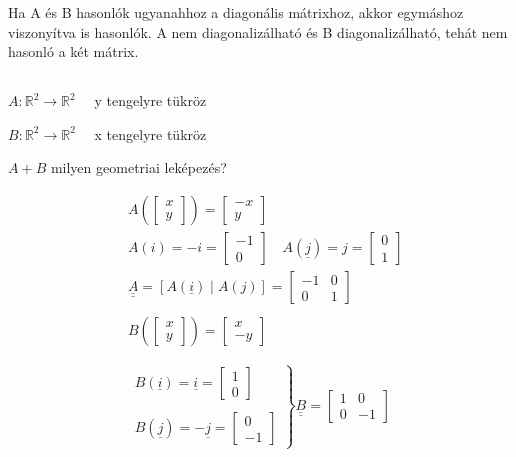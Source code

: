Ha A és B hasonlók ugyanahhoz a diagonális mátrixhoz, akkor egymáshoz viszonyítva is hasonlók. A nem diagonalizálható és B diagonalizálható, tehát nem hasonló a két mátrix.

\subsection{}
$A: \mathbb{R}^{2} \rightarrow \mathbb{R}^{2} \quad$ y tengelyre tükröz

\noindent $B: \mathbb{R}^{2} \rightarrow \mathbb{R}^{2} \quad $ x tengelyre tükröz

\vspace{2mm}
\noindent $A+B$ milyen geometriai leképezés?

$$
\begin{aligned}
& A\left(\left[\begin{array}{l}x \\y\end{array}\right]\right)=\left[\begin{array}{l}-x \\y\end{array}\right] \\
& A(i)=-i=\left[\begin{array}{c}-1 \\0\end{array}\right] \quad A(\underline{j})=j=\left[\begin{array}{l}0 \\1\end{array}\right] \\
& \underline{\underline{A}}{=}[A(\underline{i}) \mid A(j)]=\left[\begin{array}{cc}-1 & 0 \\0 & 1\end{array}\right] \\
\\
& B\left(\left[\begin{array}{l}x \\y\end{array}\right]\right)=\left[\begin{array}{c}x \\-y\end{array}\right]
\end{aligned}
$$

$$
\left.\begin{array}{c}
     B(\underline{i}) = \underline{i} = \left[\begin{array}{c}
    1  \\
    0
\end{array}\right] \\
\\
     B(\underline{j}) = -\underline{j} = \left[\begin{array}{c}
    0  \\
    -1
\end{array}\right] 
\end{array}\right\} \underline{\underline{B}} = \left[\begin{array}{cc}
    1 & 0 \\
    0 & -1
\end{array}\right]
$$

